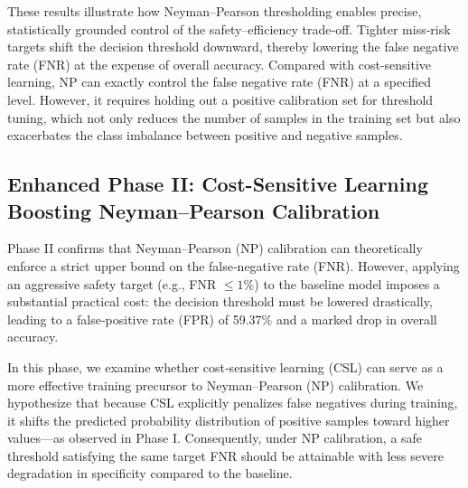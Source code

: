 \documentclass[journal,twoside,web]{ieeecolor}
\begin{document}
\begin{table}[htbp]
    \centering
    \caption{The prediction performance via NP threshold calibration.}
    \label{tab:table3}  
\end{table}
These results illustrate how Neyman–Pearson thresholding enables precise, statistically grounded control of the safety–efficiency trade‑off. Tighter miss‑risk targets shift the decision threshold downward, thereby lowering the false negative rate (FNR) at the expense of overall accuracy. Compared with cost-sensitive learning, NP can exactly control the false negative rate (FNR) at a specified level. However, it requires holding out a positive calibration set for threshold tuning, which not only reduces the number of samples in the training set but also exacerbates the class imbalance between positive and negative samples. 


\subsection{Enhanced Phase II: Cost-Sensitive Learning Boosting Neyman–Pearson Calibration}\label{S3-4}

Phase II confirms that Neyman–Pearson (NP) calibration can theoretically enforce a strict upper bound on the false‑negative rate (FNR). However, applying an aggressive safety target (e.g., FNR $\leq 1\%$) to the baseline model imposes a substantial practical cost: the decision threshold must be lowered drastically, leading to a false‑positive rate (FPR) of 59.37\% and a marked drop in overall accuracy.

In this phase, we examine whether cost‑sensitive learning (CSL) can serve as a more effective training precursor to Neyman–Pearson (NP) calibration. We hypothesize that because CSL explicitly penalizes false negatives during training, it shifts the predicted probability distribution of positive samples toward higher values—as observed in Phase I. Consequently, under NP calibration, a safe threshold satisfying the same target FNR should be attainable with less severe degradation in specificity compared to the baseline.
\end{document}
